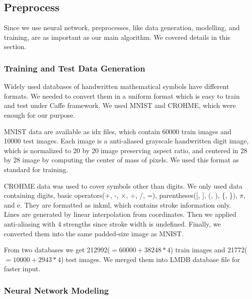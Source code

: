 \documentclass[10pt,twocolumn,letterpaper]{article}
\begin{document}

\subsection{Preprocess}

Since we use neural network, preprocesses, like data generation, modelling, and training, are as important as our main algorithm.
We covered details in this section.

\subsubsection{Training and Test Data Generation}

Widely used databases of handwritten mathematical symbols have different formats.
We needed to convert them in a uniform format which is easy to train and test under Caffe framework.
We used MNIST and CROHME, which were enough for our purpose.

MNIST data are available as idx files, which contain 60000 train images and 10000 test images.
Each image is a anti-aliased grayscale handwritten digit image, which is normalized to 20 by 20 image preserving aspect ratio, and centered in 28 by 28 image by computing the center of mass of pixels.
We used this format as standard for training.

CROHME data was used to cover symbols other than digits.
We only used data containing digits, basic operators(+, -, $\times$, $\div$, /, =), parentheses([, ], (, ), \{, \}), $\pi$, and e.
They are formatted as inkml, which contains stroke information only.
Lines are generated by linear interpolation from coordinates.
Then we applied anti-aliasing with 4 strengths since stroke width is undefined.
Finally, we converted them into the same padded-size image as MNIST.

From two databases we get 212992($=60000+38248*4$) train images and 21772($=10000+2943*4$) test images.
We merged them into LMDB database file for faster input.

\subsubsection{Neural Network Modeling}
\end{document}
